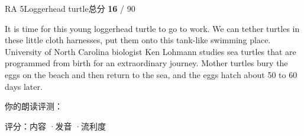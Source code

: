 \begin{qblock}{RA 5\quad Loggerhead turtle}{总分 \textcolor{cAccent}{\bfseries 16} / 90}
\begin{promptbox}
It is time for this young loggerhead turtle to go to work. We can tether turtles in these little cloth harnesses, put them onto this tank-like swimming place. University of North Carolina biologist Ken Lohmann studies sea turtles that are programmed from birth for an extraordinary journey. Mother turtles bury the eggs on the beach and then return to the sea, and the eggs hatch about 50 to 60 days later.
\end{promptbox}
\smallskip\par{\footnotesize\color{gray}你的朗读评测：}
\begin{asrbox}
       \pse {} \pse {} \pse {}     \pse {} \pse {}  \pse {}  \pse {} \pse {} \pse {} \pse {} \pse {} 
\end{asrbox}
{\small 评分：内容 \quad·\quad 发音 \quad·\quad 流利度 }
\end{qblock}

